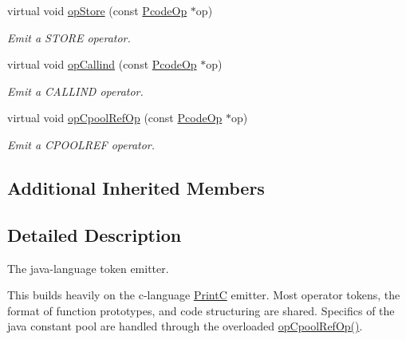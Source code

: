 \begin{DoxyCompactItemize}
virtual void \mbox{\hyperlink{class_print_java_a4aeabf0f6068948e07c03e46b92f7a56}{op\+Store}} (const \mbox{\hyperlink{class_pcode_op}{Pcode\+Op}} $\ast$op)
\begin{DoxyCompactList}\small\item\em Emit a S\+T\+O\+RE operator. \end{DoxyCompactList}\item 
virtual void \mbox{\hyperlink{class_print_java_af63d668b72d424d63128b8b6e25391b3}{op\+Callind}} (const \mbox{\hyperlink{class_pcode_op}{Pcode\+Op}} $\ast$op)
\begin{DoxyCompactList}\small\item\em Emit a C\+A\+L\+L\+I\+ND operator. \end{DoxyCompactList}\item 
virtual void \mbox{\hyperlink{class_print_java_a8e3d5480ebf8a4b59aa5729380544f15}{op\+Cpool\+Ref\+Op}} (const \mbox{\hyperlink{class_pcode_op}{Pcode\+Op}} $\ast$op)
\begin{DoxyCompactList}\small\item\em Emit a C\+P\+O\+O\+L\+R\+EF operator. \end{DoxyCompactList}\end{DoxyCompactItemize}
\subsection*{Additional Inherited Members}


\subsection{Detailed Description}
The java-\/language token emitter. 

This builds heavily on the c-\/language \mbox{\hyperlink{class_print_c}{PrintC}} emitter. Most operator tokens, the format of function prototypes, and code structuring are shared. Specifics of the java constant pool are handled through the overloaded \mbox{\hyperlink{class_print_java_a8e3d5480ebf8a4b59aa5729380544f15}{op\+Cpool\+Ref\+Op()}}.

